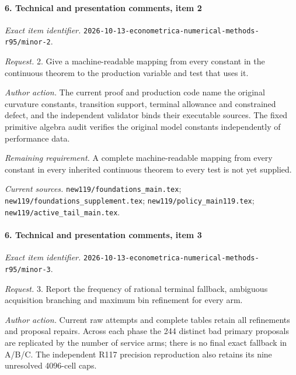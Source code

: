 \paragraph{6. Technical and presentation comments, item 2}

\emph{Exact item identifier.} \nolinkurl{2026-10-13-econometrica-numerical-methods-r95/minor-2}.

\par\emph{Request.} 2. Give a machine-readable mapping from every constant in the continuous theorem to the production variable and test that uses it.

\par\emph{Author action.} The current proof and production code name the original curvature constants, transition support, terminal allowance and constrained defect, and the independent validator binds their executable sources. The fixed primitive algebra audit verifies the original model constants independently of performance data.

\par\emph{Remaining requirement.} A complete machine-readable mapping from every constant in every inherited continuous theorem to every test is not yet supplied.

\par\emph{Current sources.} \nolinkurl{new119/foundations_main.tex}; \nolinkurl{new119/foundations_supplement.tex}; \nolinkurl{new119/policy_main119.tex}; \nolinkurl{new119/active_tail_main.tex}.

\paragraph{6. Technical and presentation comments, item 3}

\emph{Exact item identifier.} \nolinkurl{2026-10-13-econometrica-numerical-methods-r95/minor-3}.

\par\emph{Request.} 3. Report the frequency of rational terminal fallback, ambiguous acquisition branching and maximum bin refinement for every arm.

\par\emph{Author action.} Current raw attempts and complete tables retain all refinements and proposal repairs. Across each phase the 244 distinct bad primary proposals are replicated by the number of service arms; there is no final exact fallback in A/\allowbreak{}B/\allowbreak{}C. The independent R117 precision reproduction also retains its nine unresolved 4096-cell caps.

